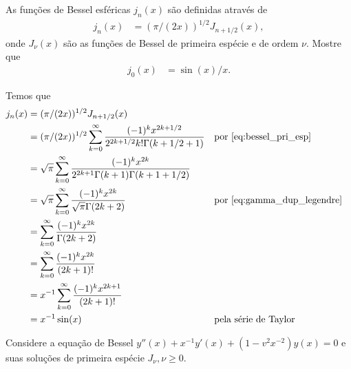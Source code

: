 \documentclass[a4paper,12pt, leqno, answers]{exam}
\begin{document}
\begin{questions}
    \question[P3 de 2006] As fun\c{c}\~{o}es de Bessel esf\'{e}ricas $j_n(x)$ s\~{a}o definidas atrav\'{e}s de
    \begin{align*}
        j_n(x) &= (\pi / (2x) )^{1/2} J_{n + 1/2}(x),
    \end{align*}
    onde $J_\nu(x)$ s\~{a}o as fun\c{c}\~{o}es de Bessel de primeira esp\'{e}cie e de ordem $\nu$. Mostre que
    \begin{align*}
        j_0(x) &= \sin(x) / x.
    \end{align*}
    \begin{solution}
        Temos que
        \begin{align*}
            j_n(x) &= (\pi / (2x) )^{1/2} J_{n + 1/2}(x) \\
            &= (\pi / (2x) )^{1/2} \sum_{k = 0}^\infty \frac{(-1)^k x^{2k + 1/2}}{2^{2k + 1/2} k! \Gamma(k + 1/2 + 1)} && \text{por \eqref{eq:bessel_pri_esp}} \\
            &= \sqrt{\pi} \sum_{k = 0}^\infty \frac{(-1)^k x^{2k}}{2^{2k + 1} \Gamma(k + 1) \Gamma(k + 1 + 1/2)} \\
            &= \sqrt{\pi} \sum_{k = 0}^\infty \frac{(-1)^k x^{2k}}{\sqrt{\pi} \Gamma(2k + 2)} && \text{por \eqref{eq:gamma_dup_legendre}} \\
            &= \sum_{k = 0}^\infty \frac{(-1)^k x^{2k}}{\Gamma(2k + 2)} \\
            &= \sum_{k = 0}^\infty \frac{(-1)^k x^{2k}}{(2k + 1)!} \\
            &= x^{-1} \sum_{k = 0}^\infty \frac{(-1)^k x^{2k + 1}}{(2k + 1)!} \\
            &= x^{-1} \sin(x) && \text{pela s\'{e}rie de Taylor}
        \end{align*}
    \end{solution}

    \question[P2 de 2010] Considere a equa\c{c}\~{a}o de Bessel $y''(x) + x^{-1} y'(x) + (1 - v^2 x^{-2}) y(x) = 0$ e suas solu\c{c}\~{o}es de primeira esp\'{e}cie $J_\nu, \nu \geq 0$.
\end{questions}
\end{document}
